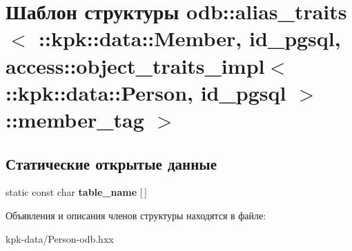 \hypertarget{structodb_1_1alias__traits_3_01_01_01_01_01_01_01_01_01_01_01_01_01_01_01_01_01_01_1_1kpk_1_1datbbb93f9720b656e53df046b831e3ff84}{}\section{Шаблон структуры odb\+:\+:alias\+\_\+traits$<$ \+:\+:kpk\+:\+:data\+:\+:Member, id\+\_\+pgsql, access\+:\+:object\+\_\+traits\+\_\+impl$<$ \+:\+:kpk\+:\+:data\+:\+:Person, id\+\_\+pgsql $>$\+:\+:member\+\_\+tag $>$}
\label{structodb_1_1alias__traits_3_01_01_01_01_01_01_01_01_01_01_01_01_01_01_01_01_01_01_1_1kpk_1_1datbbb93f9720b656e53df046b831e3ff84}
\subsection*{Статические открытые данные}
\begin{DoxyCompactItemize}
\item 
static const char {\bfseries table\+\_\+name} \mbox{[}$\,$\mbox{]}\hypertarget{structodb_1_1alias__traits_3_01_01_01_01_01_01_01_01_01_01_01_01_01_01_01_01_01_01_1_1kpk_1_1datbbb93f9720b656e53df046b831e3ff84_a6ff4f985fcc5896ca82ddd56be60a4fe}{}\label{structodb_1_1alias__traits_3_01_01_01_01_01_01_01_01_01_01_01_01_01_01_01_01_01_01_1_1kpk_1_1datbbb93f9720b656e53df046b831e3ff84_a6ff4f985fcc5896ca82ddd56be60a4fe}

\end{DoxyCompactItemize}


Объявления и описания членов структуры находятся в файле\+:\begin{DoxyCompactItemize}
\item 
kpk-\/data/Person-\/odb.\+hxx\end{DoxyCompactItemize}
